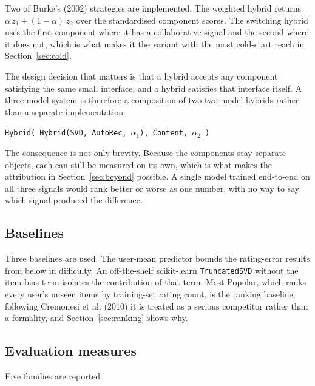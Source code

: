 \documentclass[10pt,twocolumn,letterpaper]{article}
\begin{document}
Two of Burke's (2002) strategies are implemented. The weighted hybrid returns
$\alpha\,z_1 + (1-\alpha)\,z_2$ over the standardised component scores. The
switching hybrid uses the first component where it has a collaborative signal
and the second where it does not, which is what makes it the variant with the
most cold-start reach in Section~\ref{sec:cold}.

The design decision that matters is that a hybrid accepts any component
satisfying the same small interface, and a hybrid satisfies that interface
itself. A three-model system is therefore a composition of two two-model
hybrids rather than a separate implementation:
\begin{center}
\texttt{Hybrid( Hybrid(SVD, AutoRec, $\alpha_1$), Content, $\alpha_2$ )}
\end{center}
The consequence is not only brevity. Because the components stay separate
objects, each can still be measured on its own, which is what makes the
attribution in Section~\ref{sec:beyond} possible. A single model trained
end-to-end on all three signals would rank better or worse as one number, with
no way to say which signal produced the difference.

\subsection{Baselines}
Three baselines are used. The user-mean predictor bounds the rating-error
results from below in difficulty. An off-the-shelf scikit-learn
\texttt{TruncatedSVD} without the item-bias term isolates the contribution of
that term. Most-Popular, which ranks every user's unseen items by training-set
rating count, is the ranking baseline; following Cremonesi et al. (2010) it is
treated as a serious competitor rather than a formality, and
Section~\ref{sec:ranking} shows why.

\subsection{Evaluation measures}\label{sec:metrics}
Five families are reported.
\end{document}
